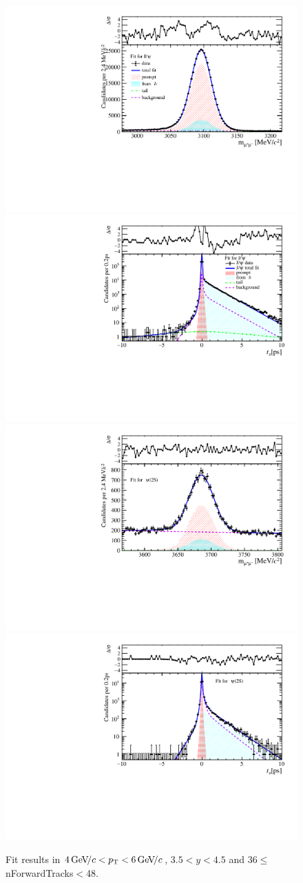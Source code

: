 \begin{figure}[H]
\begin{center}
\includegraphics[width=0.47\linewidth]{pdf/Jpsi/drawmassF/n4y3pt3.pdf}
\includegraphics[width=0.47\linewidth]{pdf/Jpsi/2DFitF/n4y3pt3.pdf}
\vspace*{-0.5cm}
\includegraphics[width=0.47\linewidth]{pdf/Psi2S/drawmassF/n4y3pt3.pdf}
\includegraphics[width=0.47\linewidth]{pdf/Psi2S/2DFitF/n4y3pt3.pdf}
\vspace*{-0.5cm}
\end{center}
\caption{Fit results in $4\text{\,Ge\kern -0.1em V\!/}c<p_{\mathrm{T}}<6\text{\,Ge\kern -0.1em V\!/}c$, $3.5<y<4.5$ and 36$\leq$nForwardTracks$<$48.}
\label{Fitn4y3pt3}
\end{figure}
